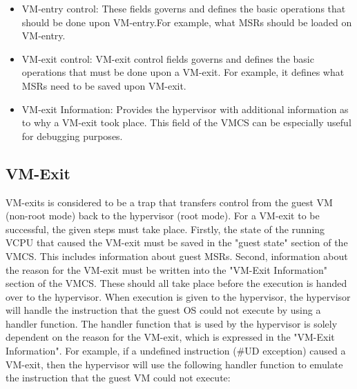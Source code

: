 \documentclass{report}
\begin{document}
\begin{spacing}{1.5}
{\begin{itemize}
    \item VM-entry control: These fields governs and defines the basic operations that should be done upon VM-entry.For example, what MSRs should be loaded on VM-entry.
    \newline

    \item VM-exit control: VM-exit control fields governs and defines the basic operations that must be done upon a VM-exit. For example, it defines what MSRs need to be saved upon VM-exit.

    \item VM-exit Information: Provides the hypervisor with additional information as to why a VM-exit took place. This field of the VMCS can be especially useful for debugging purposes.
    \newline
\end{itemize}
}






\subsection{VM-Exit}
{\large
VM-exits is considered to be a trap that transfers control from the guest VM (non-root mode) back to the hypervisor (root mode). For a VM-exit to be successful, the given steps must take place. Firstly, the state of the running VCPU that caused the VM-exit must be saved in the "guest state" section of the VMCS. This includes information about guest MSRs. Second, information about the reason for the VM-exit must be written into the "VM-Exit Information" section of the VMCS. These should all take place before the execution is handed over to the hypervisor. When execution is given to the hypervisor, the hypervisor will handle the instruction that the guest OS could not execute by using a handler function. The handler function that is used by the hypervisor is solely dependent on the reason for the VM-exit, which is expressed in the "VM-Exit Information". For example, if a undefined instruction (\#UD exception) caused a VM-exit, then the hypervisor will use the following handler function to emulate the instruction that the guest VM could not execute:
\leavevmode\newline




}
\end{spacing}
\end{document}
